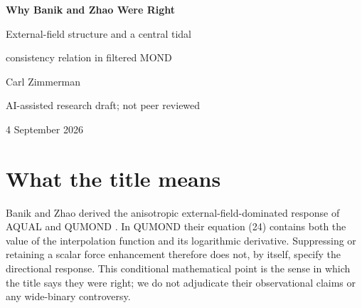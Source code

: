 \documentclass[11pt,letterpaper]{article}
\begin{document}
\begin{center}
{\LARGE\bfseries Why Banik and Zhao Were Right\par}
\vspace{8pt}
{\large External-field structure and a central tidal\par
consistency relation in filtered MOND\par}
\vspace{12pt}
Carl Zimmerman\par
\small AI-assisted research draft; not peer reviewed\par
4 September 2026
\end{center}
\begin{abstract}
A modified-gravity law cannot be tested from an isolated spherical force curve
alone: its response to an ambient field also matters. We revisit the
external-field linearization of QUMOND and study an explicitly varied,
spatially filtered specialization of its two-potential action. The Newtonian
source is left unsmoothed; variation places an adjoint filter outside the
nonlinear phantom-density source. For a spherical source perturbing a constant,
nonzero constitutive background, isotropic filtering produces a finite central
phantom-potential Hessian whenever the stated spectral integral converges.
Its trace $D$ and axial quadrupole $Q_2$ obey a division-free consistency
identity independent of source mass and filter amplitude. For the inverse
partner of $\mu(y)=1-e^{-y}$, the ratio is
$Q_2/D=2y/\{5[3+3(y-1)e^{-y}-y]\}$ where $D\ne0$.
Symbolic identities and independent quadrature over 324 cases check this
result, with a deliberately anisotropic control violating it. The contribution
is a conditional central-response corollary, not a new MOND architecture,
an empirical detection, or a completed relativistic theory.
\end{abstract}
\section{What the title means}
Banik and Zhao derived the anisotropic external-field-dominated response of
AQUAL and QUMOND \cite{banik}. In QUMOND their equation (24) contains both
the value of the interpolation function and its logarithmic derivative.
Suppressing or retaining a scalar force enhancement therefore does not, by
itself, specify the directional response. This conditional mathematical point
is the sense in which the title says they were right; we do not adjudicate
their observational claims or any wide-binary controversy.
\end{document}
